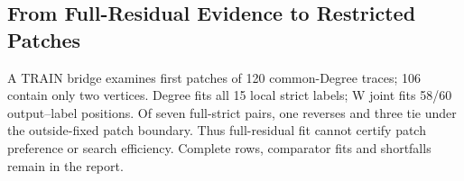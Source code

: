 \subsection{From Full-Residual Evidence to Restricted Patches}
\label{sec:v06-patch-bridge}
A TRAIN bridge examines first patches of 120 common-Degree traces;
106 contain only two vertices. Degree fits all 15 local strict labels;
W joint fits 58/60 output--label positions. Of seven full-strict pairs,
one reverses and three tie under the outside-fixed patch boundary.
Thus full-residual fit cannot certify patch preference or search efficiency.
Complete rows, comparator fits and shortfalls remain in the report.
